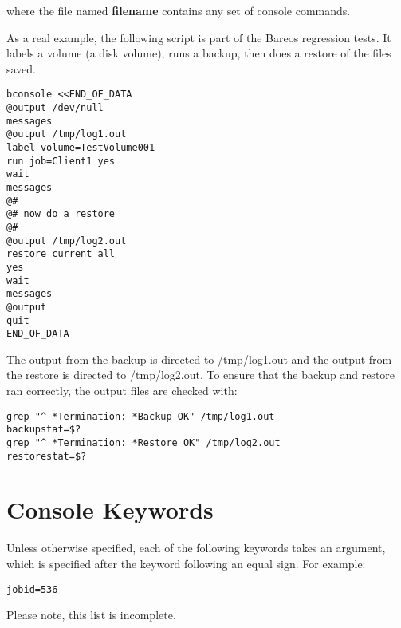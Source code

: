 where the file named {\bf filename} contains any set of console commands.

As a real example, the following script is part of the Bareos regression
tests. It labels a volume (a disk volume), runs a backup, then does a restore
of the files saved.

\footnotesize
\begin{verbatim}
bconsole <<END_OF_DATA
@output /dev/null
messages
@output /tmp/log1.out
label volume=TestVolume001
run job=Client1 yes
wait
messages
@#
@# now do a restore
@#
@output /tmp/log2.out
restore current all
yes
wait
messages
@output
quit
END_OF_DATA
\end{verbatim}
\normalsize

The output from the backup is directed to /tmp/log1.out and the output from
the restore is directed to /tmp/log2.out. To ensure that the backup and
restore ran correctly, the output files are checked with:

\footnotesize
\begin{verbatim}
grep "^ *Termination: *Backup OK" /tmp/log1.out
backupstat=$?
grep "^ *Termination: *Restore OK" /tmp/log2.out
restorestat=$?
\end{verbatim}
\normalsize


\section{Console Keywords}

Unless otherwise specified, each of the following keywords
takes an argument, which is specified after the keyword following
an equal sign. For example:

\begin{verbatim}
jobid=536
\end{verbatim}

Please note, this list is incomplete.



